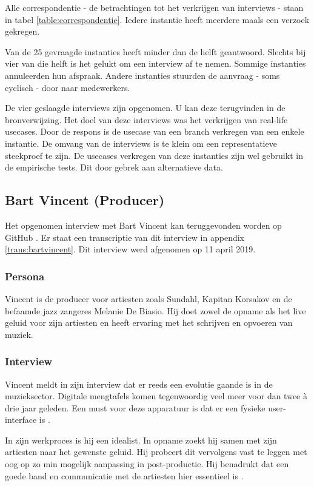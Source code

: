 Alle correspondentie - de betrachtingen tot het verkrijgen van interviews - staan in tabel \ref{table:correspondentie}. Iedere instantie heeft meerdere maals een verzoek gekregen. 

Van de 25 gevraagde instanties heeft minder dan de helft geantwoord. Slechts bij vier van die helft is het gelukt om een interview af te nemen. Sommige instanties annuleerden hun afspraak. Andere instanties stuurden de aanvraag - soms cyclisch - door naar medewerkers.

De vier geslaagde interviews zijn opgenomen. U kan deze terugvinden in de bronverwijzing. Het doel van deze interviews was het verkrijgen van real-life usecases. Door de respons is de usecase van een branch verkregen van een enkele instantie. De omvang van de interviews is te klein om een representatieve steekproef te zijn. De usecases verkregen van deze instanties zijn wel gebruikt in de empirische tests. Dit door gebrek aan alternatieve data.

\subsection{Bart Vincent (Producer)}

Het opgenomen interview met Bart Vincent kan teruggevonden worden op GitHub \autocite{bartvincent}. Er staat een transcriptie van dit interview in appendix \ref{trans:bartvincent}. Dit interview werd afgenomen op 11 april 2019.

\subsubsection*{Persona}

Vincent is de producer voor artiesten zoals Sundahl, Kapitan Korsakov en de befaamde jazz zangeres Melanie De Biasio. Hij doet zowel de opname als het live geluid voor zijn artiesten en heeft ervaring met het schrijven en opvoeren van muziek.

\subsubsection*{Interview}

Vincent meldt in zijn interview dat er reeds een evolutie gaande is in de muzieksector. Digitale mengtafels komen tegenwoordig veel meer voor dan twee à drie jaar geleden. Een must voor deze apparatuur is dat er een fysieke user-interface is \autocite{bartvincent}.

In zijn werkproces is hij een idealist. In opname zoekt hij samen met zijn artiesten naar het gewenste geluid. Hij probeert dit vervolgens vast te leggen met oog op zo min mogelijk aanpassing in post-productie. Hij benadrukt dat een goede band en communicatie met de artiesten hier essentieel is \autocite{bartvincent}.

